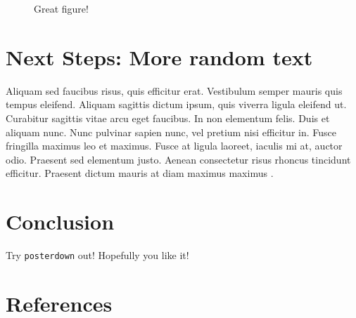 \documentclass[article,30pt,extrafontsizes]{memoir}
\begin{document}
\begin{adjmulticols*}{2}{0.5in}{0.5in}
{\begin{figure}
{}

\caption{Great figure!}\label{fig:standard-plot}
\end{figure}

\hypertarget{next-steps-more-random-text}{%
\section{Next Steps: More random
text}\label{next-steps-more-random-text}}

Aliquam sed faucibus risus, quis efficitur erat. Vestibulum semper
mauris quis tempus eleifend. Aliquam sagittis dictum ipsum, quis viverra
ligula eleifend ut. Curabitur sagittis vitae arcu eget faucibus. In non
elementum felis. Duis et aliquam nunc. Nunc pulvinar sapien nunc, vel
pretium nisi efficitur in. Fusce fringilla maximus leo et maximus. Fusce
at ligula laoreet, iaculis mi at, auctor odio. Praesent sed elementum
justo. Aenean consectetur risus rhoncus tincidunt efficitur. Praesent
dictum mauris at diam maximus maximus \autocite{thorneposterdown2019}.

\hypertarget{conclusion}{%
\section{Conclusion}\label{conclusion}}

Try \texttt{posterdown} out! Hopefully you like it!

\hypertarget{references}{%
\section{References}\label{references}}

\printbibliography
}
\end{adjmulticols*}
\end{document}
